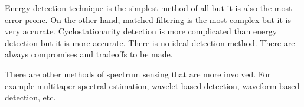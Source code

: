 Energy detection technique is the simplest method of all but it is also the 
most error prone. On the other hand, matched filtering is the most complex but 
it is very accurate. Cyclostationarity detection is more complicated than 
energy detection but it is more accurate. There is no ideal detection method.
There are always compromises and tradeoffs to be made.

There are other methods of spectrum sensing that are more involved. For
example multitaper spectral estimation, wavelet based detection, waveform
based detection, etc. 
